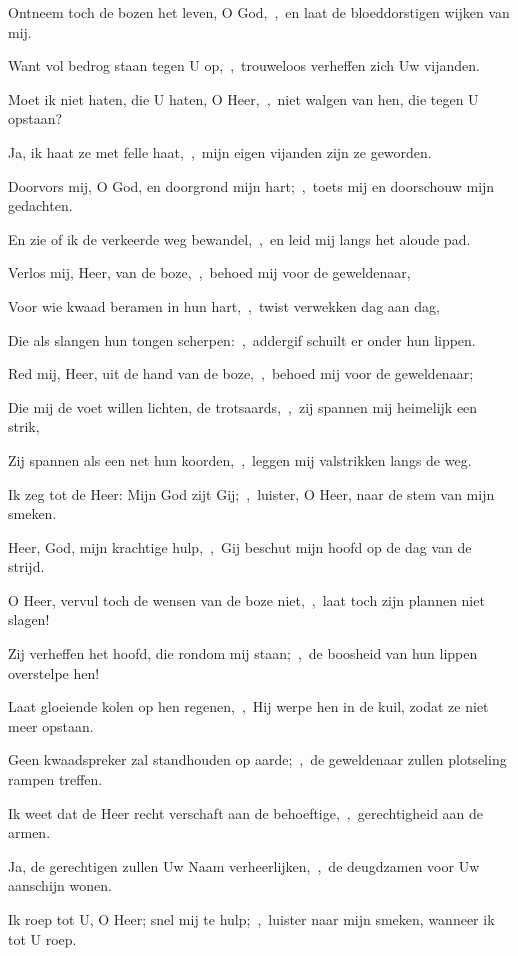 \documentclass[12pt,twoside,a5paper]{article}
\begin{document}
\begin{halfparskip}
  Ontneem toch de bozen het leven, O God,~\sep\ en laat de bloeddorstigen wijken van mij.

  Want vol bedrog staan tegen U op,~\sep\ trouweloos verheffen zich Uw vijanden.

  Moet ik niet haten, die U haten, O Heer,~\sep\ niet walgen van hen, die tegen U opstaan?

  Ja, ik haat ze met felle haat,~\sep\ mijn eigen vijanden zijn ze geworden.

  Doorvors mij, O God, en doorgrond mijn hart;~\sep\ toets mij en doorschouw mijn gedachten.

  En zie of ik de verkeerde weg bewandel,~\sep\ en leid mij langs het aloude pad.

   Verlos mij, Heer, van de boze,~\sep\ behoed mij voor de geweldenaar,

  Voor wie kwaad beramen in hun hart,~\sep\ twist verwekken dag aan dag,

  Die als slangen hun tongen scherpen:~\sep\ addergif schuilt er onder hun lippen.

  Red mij, Heer, uit de hand van de boze,~\sep\ behoed mij voor de geweldenaar;

  Die mij de voet willen lichten, de trotsaards,~\sep\ zij spannen mij heimelijk een strik,

  Zij spannen als een net hun koorden,~\sep\ leggen mij valstrikken langs de weg.

  Ik zeg tot de Heer: Mijn God zijt Gij;~\sep\ luister, O Heer, naar de stem van mijn smeken.

  Heer, God, mijn krachtige hulp,~\sep\ Gij beschut mijn hoofd op de dag van de strijd.

  O Heer, vervul toch de wensen van de boze niet,~\sep\ laat toch zijn plannen niet slagen!

  Zij verheffen het hoofd, die rondom mij staan;~\sep\ de boosheid van hun lippen overstelpe hen!

  Laat gloeiende kolen op hen regenen,~\sep\ Hij werpe hen in de kuil, zodat ze niet meer opstaan.

  Geen kwaadspreker zal standhouden op aarde;~\sep\ de geweldenaar zullen plotseling rampen treffen.

  Ik weet dat de Heer recht verschaft aan de behoeftige,~\sep\ gerechtigheid aan de armen.

  Ja, de gerechtigen zullen Uw Naam verheerlijken,~\sep\ de deugdzamen voor Uw aanschijn wonen.

   Ik roep tot U, O Heer; snel mij te hulp;~\sep\ luister naar mijn smeken, wanneer ik tot U roep.


\end{halfparskip}
\end{document}
